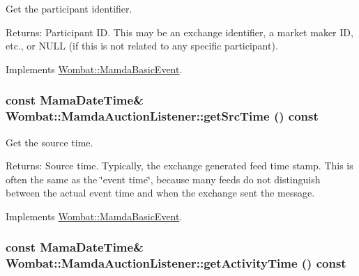 Get the participant identifier. 

\begin{Desc}
\item[Returns:]Participant ID. This may be an exchange identifier, a market maker ID, etc., or NULL (if this is not related to any specific participant). \end{Desc}


Implements \hyperlink{classWombat_1_1MamdaBasicEvent_94e531c6ae9ae7798725db14facbd6e2}{Wombat::Mamda\-Basic\-Event}.\hypertarget{classWombat_1_1MamdaAuctionListener_4632a4659cd012dee4d8059ee7fab6c7}{
\subsubsection[getSrcTime]{\setlength{\rightskip}{0pt plus 5cm}const Mama\-Date\-Time\& Wombat::Mamda\-Auction\-Listener::get\-Src\-Time () const}}
\label{classWombat_1_1MamdaAuctionListener_4632a4659cd012dee4d8059ee7fab6c7}


Get the source time. 

\begin{Desc}
\item[Returns:]Source time. Typically, the exchange generated feed time stamp. This is often the same as the \char`\"{}event time\char`\"{}, because many feeds do not distinguish between the actual event time and when the exchange sent the message. \end{Desc}


Implements \hyperlink{classWombat_1_1MamdaBasicEvent_60b5d51f3799c4762090505ef5b213e9}{Wombat::Mamda\-Basic\-Event}.\hypertarget{classWombat_1_1MamdaAuctionListener_1e1e7f267e1681fe0edddd1a9748bc9e}{
\subsubsection[getActivityTime]{\setlength{\rightskip}{0pt plus 5cm}const Mama\-Date\-Time\& Wombat::Mamda\-Auction\-Listener::get\-Activity\-Time () const}}
\label{classWombat_1_1MamdaAuctionListener_1e1e7f267e1681fe0edddd1a9748bc9e}


